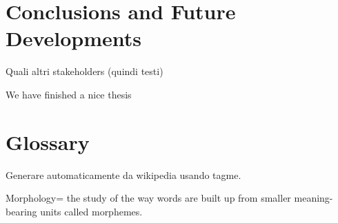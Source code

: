 \documentclass[]{book}
\begin{document}
\chapter*{Conclusions and Future
Developments}\label{conclusions-and-future-developments}

Quali altri stakeholders (quindi testi)

We have finished a nice thesis

\chapter*{Glossary}\label{glossary}

Generare automaticamente da wikipedia usando tagme.

Morphology= the study of the way words are built up from smaller
meaning-bearing units called morphemes.


\end{document}
